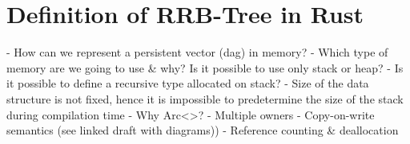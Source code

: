 \chapter{Definition of RRB-Tree in Rust}

- How can we represent a persistent vector (dag) in memory?
    - Which type of memory are we going to use \& why? Is it possible to use only stack or heap?
        - Is it possible to define a recursive type allocated on stack?
        - Size of the data structure is not fixed, hence it is impossible to predetermine the size of the stack during compilation time
- Why Arc<>?
- Multiple owners
- Copy-on-write semantics (see linked draft with diagrams))
- Reference counting \& deallocation
